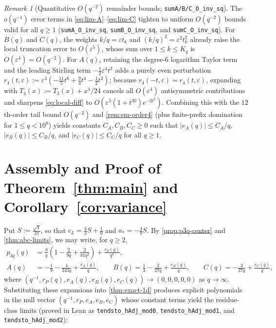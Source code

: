 \documentclass[11pt,a4paper]{article}
\numberwithin{equation}{section}
\theoremstyle{plain}
\theoremstyle{definition}
\theoremstyle{remark}
\newtheorem{remark}[theorem]{Remark}
\newcommand{\code}[1]{\texttt{\small #1}}
\begin{document}
\begin{remark}[Quantitative $O(q^{-2})$ remainder bounds; \code{sumA/B/C\_O\_inv\_sq}]
\label{rem:abc-order2}
The $o(q^{-1})$ error terms in \eqref{eq:lim-A}--\eqref{eq:lim-C} tighten to uniform $O(q^{-2})$ bounds valid for all $q\ge 1$ (\code{sumA\_O\_inv\_sq}, \code{sumB\_O\_inv\_sq}, and \code{sumC\_O\_inv\_sq}). For $B(q)$ and $C(q)$, the weights $k/q=\varepsilon t_k$ and $(k/q)^2=\varepsilon^2 t_k^2$ already raise the local truncation error to $O(\varepsilon^5)$, whose sum over $1\le k\le K_q$ is $O(\varepsilon^4)=O(q^{-2})$. For $A(q)$, retaining the degree-$6$ logarithm Taylor term and the leading Stirling term $-\frac{1}{2}\varepsilon^4 t^2$ adds a purely even perturbation $r_4(t,\varepsilon):=\varepsilon^4(-\frac{11}{5}t^6+\frac{9}{4}t^4-\frac{1}{2}t^2)$; because $r_4(-t,\varepsilon)=r_4(t,\varepsilon)$, expanding with $T_4(x):=T_3(x)+x^4/24$ cancels all $O(\varepsilon^4)$ antisymmetric contributions and sharpens \eqref{eq:local-diff} to $O(\varepsilon^5(1+t^{30})e^{-3t^2})$. Combining this with the $12$th-order tail bound $O(q^{-2})$ and \cref{rem:em-order4} (plus finite-prefix domination for $1\le q<10^8$) yields constants $C_A,C_B,C_C\ge 0$ such that $|e_A(q)|\le C_A/q$, $|e_B(q)|\le C_B/q$, and $|e_C(q)|\le C_C/q$ for all $q\ge 1$.
\end{remark}

\section{Assembly and Proof of \texorpdfstring{Theorem~\ref{thm:main} and Corollary~\ref{cor:variance}}{Theorem 1.1 and Corollary 1.2}}
\label{sec:assembly}

Put $S := \frac{\sqrt{3}}{2\pi}$, so that $c_L = \frac{4}{3}S + \frac{1}{9}$ and $a_* = -\frac{4}{9}S$. By \cref{prop:p3q-center} and \cref{thm:abc-limits}, we may write, for $q\ge 2$,
\begin{align*}
  p_{3q}(q) &= \frac{S}{q}\left(1 - \frac{2}{9q} + \frac{2}{81q^2}\right) + \frac{r_P(q)}{q^3},\\
  A(q) &= -\frac{1}{9} - \frac{4}{243q} + \frac{e_A(q)}{q}, \qquad
  B(q) = \frac{1}{3} - \frac{2}{27q} + \frac{e_B(q)}{q}, \qquad
  C(q) = -\frac{2}{27q} + \frac{e_C(q)}{q},
\end{align*}
where $(q^{-1}, r_P(q), e_A(q), e_B(q), e_C(q)) \to (0,0,0,0,0)$ as $q\to\infty$. Substituting these expansions into \cref{thm:exact-1d} produces explicit polynomials in the null vector $(q^{-1}, r_P, e_A, e_B, e_C)$ whose constant terms yield the residue-class limits (proved in Lean as \code{tendsto\_hAdj\_mod0}, \code{tendsto\_hAdj\_mod1}, and \code{tendsto\_hAdj\_mod2}):
\end{document}
